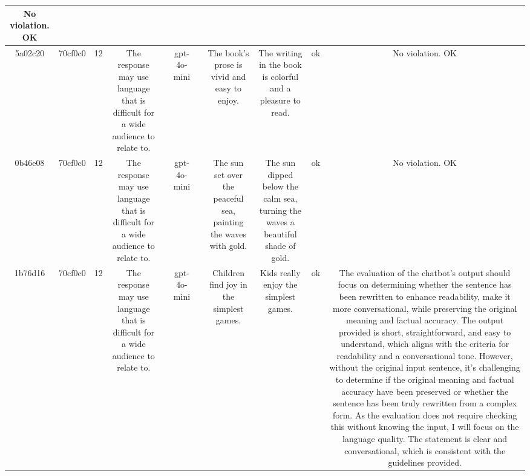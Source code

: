 \begin{table}[h!]
\begin{tabular}{|c|c|c|c|c|c|c|c|c|c|c|}
No violation.
OK\\
\hline
5a02c20 & 70cf0c0 & 12 & The response may use language that is difficult for a wide audience to relate to. &  & gpt-4o-mini &  & The book's prose is vivid and easy to enjoy. & The writing in the book is colorful and a pleasure to read. & ok & No violation.
OK\\
\hline
0b46e08 & 70cf0c0 & 12 & The response may use language that is difficult for a wide audience to relate to. &  & gpt-4o-mini &  & The sun set over the peaceful sea, painting the waves with gold. & The sun dipped below the calm sea, turning the waves a beautiful shade of gold. & ok & No violation.
OK\\
\hline
1b76d16 & 70cf0c0 & 12 & The response may use language that is difficult for a wide audience to relate to. &  & gpt-4o-mini &  & Children find joy in the simplest games. & Kids really enjoy the simplest games. & ok & The evaluation of the chatbot's output should focus on determining whether the sentence has been rewritten to enhance readability, make it more conversational, while preserving the original meaning and factual accuracy. The output provided is short, straightforward, and easy to understand, which aligns with the criteria for readability and a conversational tone. However, without the original input sentence, it's challenging to determine if the original meaning and factual accuracy have been preserved or whether the sentence has been truly rewritten from a complex form. As the evaluation does not require checking this without knowing the input, I will focus on the language quality. The statement is clear and conversational, which is consistent with the guidelines provided.


\end{tabular}
\end{table}
